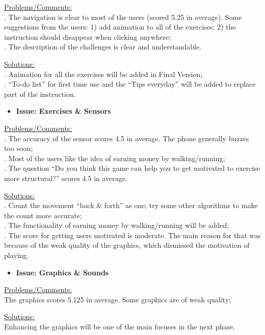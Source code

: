 \documentclass{article}
\begin{document}
\underline{Problems/Comments:} \\
. The navigation is clear to most of the users (scored 5.25 in average). Some suggestions from the users: 1) add animation to all of the exercises; 2) the instruction should disappear when clicking anywhere;\\
. The description of the challenges is clear and understandable.

\underline{Solutions:} \\
. Animation for all the exercises will be added in Final Version;\\
. “To-do list” for first time use and the “Tips everyday” will be added to replace part of the instruction.


\begin{itemize}
    \item{\textbf{Issue: Exercises \& Sensors}}
\end{itemize}

\underline{Problems/Comments:} \\
. The accuracy of the sensor scores 4.5 in average. The phone generally buzzes too soon;\\
. Most of the users like the idea of earning money by walking/running;\\
. The question “Do you think this game can help you to get motivated to exercise more structural?” scores 4.5 in average.

\underline{Solutions:} \\
. Count the movement “back \& forth” as one; try some other algorithms to make the count more accurate;\\
. The functionality of earning money by walking/running will be added;\\
. The score for getting users motivated is moderate. The main reason for that was because of the weak quality of the graphics, which dismissed the motivation of playing.


\begin{itemize}
    \item{\textbf{Issue: Graphics \& Sounds}}
\end{itemize}

\underline{Problems/Comments:} \\\indent The graphics scores 5.125 in average. Some graphics are of weak quality; 

\underline{Solutions:} \\\indent Enhancing the graphics will be one of the main focuses in the next phase.
\end{document}
